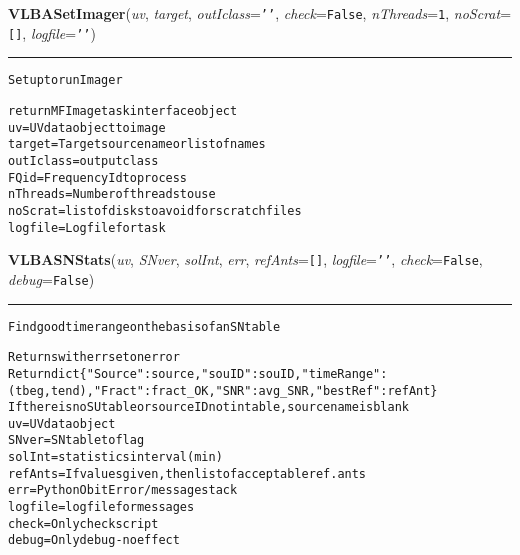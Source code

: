     \label{VLBACal:VLBASetImager}
    \vspace{0.5ex}

    \begin{boxedminipage}{\textwidth}

    \raggedright \textbf{VLBASetImager}(\textit{uv}, \textit{target}, \textit{outIclass}=\texttt{'\-'\-}, \textit{check}=\texttt{F\-a\-l\-s\-e\-}, \textit{nThreads}=\texttt{1\-}, \textit{noScrat}=\texttt{[\-]\-}, \textit{logfile}=\texttt{'\-'\-})

    \vspace{-1.5ex}

    \rule{\textwidth}{0.5\fboxrule}
\begin{alltt}
Setup to run Imager

return MFImage task interface object
uv       = UV data object to image
target   = Target source name or list of names
outIclass= output class
FQid     = Frequency Id to process
nThreads = Number of threads to use
noScrat  = list of disks to avoid for scratch files
logfile  = Log file for task\end{alltt}

    \vspace{1ex}

    \end{boxedminipage}

    \label{VLBACal:VLBASNStats}
    \vspace{0.5ex}

    \begin{boxedminipage}{\textwidth}

    \raggedright \textbf{VLBASNStats}(\textit{uv}, \textit{SNver}, \textit{solInt}, \textit{err}, \textit{refAnts}=\texttt{[\-]\-}, \textit{logfile}=\texttt{'\-'\-}, \textit{check}=\texttt{F\-a\-l\-s\-e\-}, \textit{debug}=\texttt{F\-a\-l\-s\-e\-})

    \vspace{-1.5ex}

    \rule{\textwidth}{0.5\fboxrule}
\begin{alltt}
Find good timerange on the basis of an SN table

Returns with err set on error
Return dict \{"Source":source, "souID":souID, "timeRange":(tbeg,tend),                   "Fract":fract\_OK, "SNR":avg\_SNR,"bestRef":refAnt\}
If there is no SU table or source ID not in table, source name is blank
uv         = UV data object
SNver      = SN table to flag
solInt     = statistics interval (min)
refAnts    = If values given, then list of acceptable ref. ants
err        = Python Obit Error/message stack
logfile    = logfile for messages
check      = Only check script
debug      = Only debug - no effect\end{alltt}

    \vspace{1ex}

    \end{boxedminipage}

